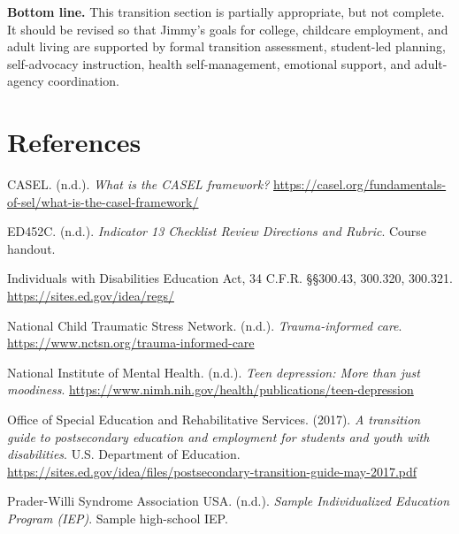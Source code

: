 \documentclass[11pt]{article}
\begin{document}
\begin{ReflectionBox}
\textbf{Bottom line.} This transition section is partially appropriate, but not complete. It should be revised so that Jimmy's goals for college, childcare employment, and adult living are supported by formal transition assessment, student-led planning, self-advocacy instruction, health self-management, emotional support, and adult-agency coordination.
\end{ReflectionBox}

\section*{References}
\small
CASEL. (n.d.). \textit{What is the CASEL framework?} \url{https://casel.org/fundamentals-of-sel/what-is-the-casel-framework/}

ED452C. (n.d.). \textit{Indicator 13 Checklist Review Directions and Rubric}. Course handout.

Individuals with Disabilities Education Act, 34 C.F.R. \S\S 300.43, 300.320, 300.321. \url{https://sites.ed.gov/idea/regs/}

National Child Traumatic Stress Network. (n.d.). \textit{Trauma-informed care}. \url{https://www.nctsn.org/trauma-informed-care}

National Institute of Mental Health. (n.d.). \textit{Teen depression: More than just moodiness}. \url{https://www.nimh.nih.gov/health/publications/teen-depression}

Office of Special Education and Rehabilitative Services. (2017). \textit{A transition guide to postsecondary education and employment for students and youth with disabilities}. U.S. Department of Education. \url{https://sites.ed.gov/idea/files/postsecondary-transition-guide-may-2017.pdf}

Prader-Willi Syndrome Association USA. (n.d.). \textit{Sample Individualized Education Program (IEP)}. Sample high-school IEP.
\end{document}

